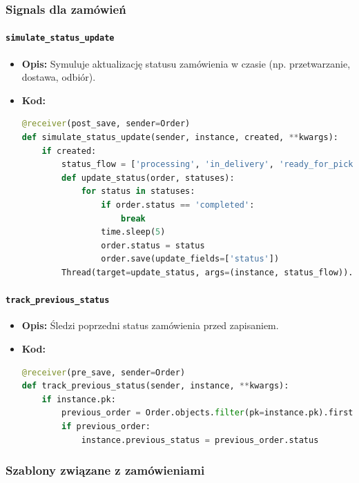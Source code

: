 \documentclass[12pt,a4paper,oneside]{article}
\theoremstyle{definition}
\numberwithin{equation}{section}
\begin{document}
\subsubsection{Signals dla zamówień}

\paragraph{\texttt{simulate\_status\_update}}
\begin{itemize}
    \item \textbf{Opis:} Symuluje aktualizację statusu zamówienia w czasie (np. przetwarzanie, dostawa, odbiór).
    \item \textbf{Kod:}
    \begin{lstlisting}[language=Python]
@receiver(post_save, sender=Order)
def simulate_status_update(sender, instance, created, **kwargs):
    if created:
        status_flow = ['processing', 'in_delivery', 'ready_for_pickup', 'completed']
        def update_status(order, statuses):
            for status in statuses:
                if order.status == 'completed':
                    break
                time.sleep(5)
                order.status = status
                order.save(update_fields=['status'])
        Thread(target=update_status, args=(instance, status_flow)).start()
    \end{lstlisting}
\end{itemize}

\paragraph{\texttt{track\_previous\_status}}
\begin{itemize}
    \item \textbf{Opis:} Śledzi poprzedni status zamówienia przed zapisaniem.
    \item \textbf{Kod:}
    \begin{lstlisting}[language=Python]
@receiver(pre_save, sender=Order)
def track_previous_status(sender, instance, **kwargs):
    if instance.pk:
        previous_order = Order.objects.filter(pk=instance.pk).first()
        if previous_order:
            instance.previous_status = previous_order.status
    \end{lstlisting}
\end{itemize}

\subsubsection{Szablony związane z zamówieniami}
\end{document}
